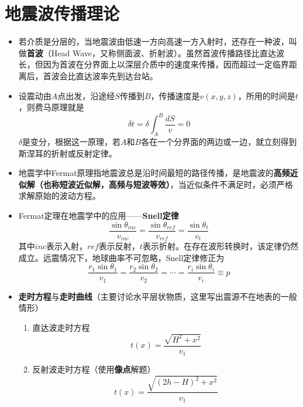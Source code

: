 \documentclass[twoside,titlepage,hyperref,UTF8,12pt]{ctexart}
\begin{document}
\section{地震波传播理论}
\begin{itemize}
    \item 若介质是分层的，当地震波由低速一方向高速一方入射时，还存在一种波，叫做\textbf{首波}（Head Wave，又称侧面波、折射波）。虽然首波传播路径比直达波长，但因为首波在分界面上以深层介质中的速度来传播，因而超过一定临界距离后，首波会比直达波率先到达台站。
    \item 设震动由$A$点出发，沿途经$S$传播到$B$，传播速度是$v(x, y, z)$，所用的时间是$t$，则费马原理就是
        \begin{equation}
            \delta t = \delta\int_{A}^{B} \frac{dS}{v} = 0
        \end{equation}
        $\delta$是变分，根据这一原理，若$A$和$B$各在一个分界面的两边或一边，就立刻得到斯涅耳的折射或反射定律。
    \item 地震学中Fermat原理指地震波总是沿时间最短的路径传播，是地震波的\textbf{高频近似解（也称短波近似解，高频与短波等效）}，当近似条件不满足时，必须严格求解原始的波动方程。
    \item Fermat定理在地震学中的应用——\textbf{Snell定律}
        \begin{equation}
            \frac{\sin \theta_{inc}}{v_{inc}} = \frac{\sin \theta_{ref}}{v_{ref}} =  \frac{\sin \theta_t}{v_t}
        \end{equation}
        其中$inc$表示入射，$ref$表示反射，$t$表示折射。在存在波形转换时，该定律仍然成立。远震情况下，地球曲率不可忽略，Snell定律修正为
        \begin{equation}
            \frac{r_1 \sin \theta_1}{v_1} = \frac{r_2 \sin \theta_2}{v_2} = \cdots = \frac{r_i \sin \theta_i}{v_i} \equiv p
        \end{equation}
    \item \textbf{走时方程}与\textbf{走时曲线}（主要讨论水平层状物质，这里写出震源不在地表的一般情形）
        \begin{enumerate}
            \item 直达波走时方程
                \begin{equation}
                    t(x) = \frac{\sqrt{H^2 + x^2}}{v_1}
                \end{equation}
            \item 反射波走时方程（使用\textbf{像点}解题）
                \begin{equation}
                    t(x) = \frac{\sqrt{{(2h - H)}^2 + x^2}}{v_1}

\end{equation}
\end{enumerate}
\end{itemize}
\end{document}
